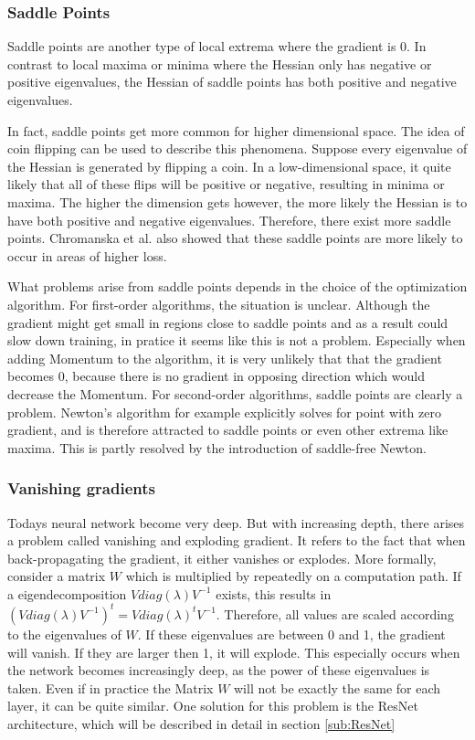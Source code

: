 \subsubsection{Saddle Points}\label{prob:3}
Saddle points are another type of local extrema where the gradient is 0. In
contrast to local maxima or minima where the Hessian only has negative or
positive eigenvalues, the Hessian of saddle points has both positive and
negative eigenvalues.

In fact, saddle points get more common for higher dimensional space. The idea of
coin flipping can be used to describe this phenomena. Suppose every eigenvalue
of the Hessian is generated by flipping a coin. In a low-dimensional space, it
quite likely that all of these flips will be positive or negative, resulting in
minima or maxima. The higher the dimension gets however, the more likely the
Hessian is to have both positive and negative eigenvalues. Therefore, there
exist more saddle points. Chromanska et al. \cite{choromanska2015loss} also
showed that these saddle points are more likely to occur in areas of higher
loss.

What problems arise from saddle points depends in the choice of the optimization
algorithm. For first-order algorithms, the situation is unclear. Although the
gradient might get small in regions close to saddle points and as a result could
slow down training, in pratice it seems like this is not a problem. Especially
when adding Momentum to the algorithm, it is very unlikely that that the
gradient becomes 0, because there is no gradient in opposing direction which
would decrease the Momentum. For second-order algorithms, saddle points are
clearly a problem. Newton's algorithm for example explicitly solves for point
with zero gradient, and is therefore attracted to saddle points or even other
extrema like maxima. This is partly resolved by the introduction of saddle-free
Newton. 


\subsubsection{Vanishing gradients}\label{sub:Vanishing_gradient}

Todays neural network become very deep. But with increasing depth, there arises
a problem called vanishing and exploding gradient. It refers to the fact that
when back-propagating the gradient, it either vanishes or explodes. More
formally, consider a matrix $W$ which is multiplied by repeatedly on a
computation path. If a eigendecomposition $Vdiag(\lambda )V^{-1}$ exists, this
results in $(Vdiag(\lambda )V^{-1})^t=Vdiag(\lambda )^tV^{-1}$. Therefore, all
values are scaled according to the eigenvalues of $W$. If these eigenvalues are
between 0 and 1, the gradient will vanish. If they are larger then 1, it will
explode. This especially occurs when the network becomes increasingly deep, as
the power of these eigenvalues is taken. Even if in practice the Matrix $W$ will
not be exactly the same for each layer, it can be quite similar. One solution
for this problem is the ResNet architecture, which will be described in detail
in section
\ref{sub:ResNet}

